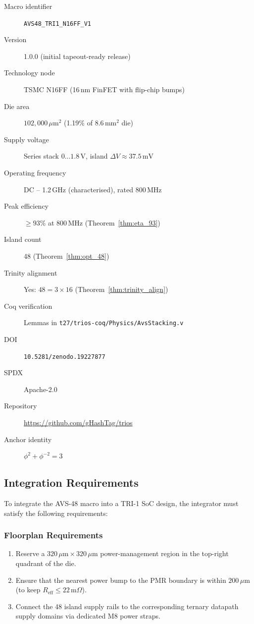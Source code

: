 \begin{description}
  \item[Macro identifier] \texttt{AVS48\_TRI1\_N16FF\_V1}
  \item[Version] 1.0.0 (initial tapeout-ready release)
  \item[Technology node] TSMC N16FF (16\,nm FinFET with flip-chip bumps)
  \item[Die area] $102{,}000\,\mu\mathrm{m}^2$ (1.19\% of $8.6\,\mathrm{mm}^2$ die)
  \item[Supply voltage] Series stack $0 \ldots 1.8\,\mathrm{V}$, island $\Delta V \approx 37.5\,\mathrm{mV}$
  \item[Operating frequency] DC -- 1.2\,GHz (characterised), rated 800\,MHz
  \item[Peak efficiency] $\geq 93\%$ at 800\,MHz (Theorem~\ref{thm:eta_93})
  \item[Island count] 48 (Theorem~\ref{thm:opt_48})
  \item[Trinity alignment] Yes: $48 = 3 \times 16$ (Theorem~\ref{thm:trinity_align})
  \item[Coq verification] Lemmas in \texttt{t27/trios-coq/Physics/AvsStacking.v}
  \item[DOI] \texttt{10.5281/zenodo.19227877}
  \item[SPDX] Apache-2.0
  \item[Repository] \url{https://github.com/gHashTag/trios}
  \item[Anchor identity] $\phi^2 + \phi^{-2} = 3$
\end{description}

\subsection{Integration Requirements}

To integrate the AVS-48 macro into a TRI-1 SoC design, the integrator
must satisfy the following requirements:

\subsubsection{Floorplan Requirements}
\begin{enumerate}
  \item Reserve a $320\,\mu\mathrm{m} \times 320\,\mu\mathrm{m}$ power-management region
        in the top-right quadrant of the die.
  \item Ensure that the nearest power bump to the PMR boundary is within
        $200\,\mu\mathrm{m}$ (to keep $R_{\mathrm{eff}} \leq 22\,\mathrm{m}\Omega$).
  \item Connect the 48 island supply rails to the corresponding ternary
        datapath supply domains via dedicated M8 power straps.
\end{enumerate}

